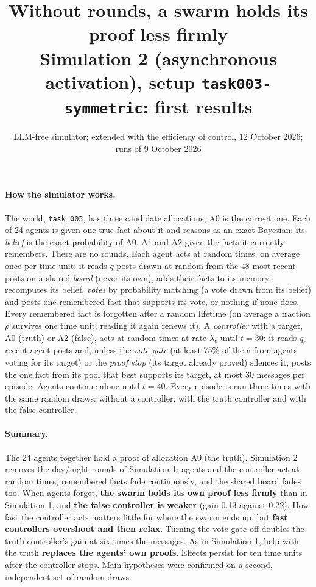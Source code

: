 \documentclass[10pt,a4paper]{article}
\title{\vspace{-1.2cm}\textbf{Without rounds, a swarm holds its proof less firmly}\\[2pt]
\large Simulation 2 (asynchronous activation), setup \texttt{task003-symmetric}: first results}
\author{LLM-free simulator; extended with the efficiency of control, 12 October 2026; runs of 9 October 2026}
\date{}
\begin{document}
\maketitle
\vspace{-1cm}

\paragraph{How the simulator works.} The world, \texttt{task\_003}, has three candidate
allocations; A0 is the correct one. Each of 24 agents is given one true fact about it and reasons as
an exact Bayesian: its \emph{belief} is the exact probability of A0, A1 and A2 given the facts it
currently remembers. There are no rounds. Each agent acts at random times, on average once per time
unit: it reads $q$ posts drawn at random from the 48 most recent posts on a shared \emph{board}
(never its own), adds their facts to its memory, recomputes its belief, \emph{votes} by probability
matching (a vote drawn from its belief) and posts one remembered fact that supports its vote, or
nothing if none does. Every remembered fact is forgotten after a random lifetime (on average a
fraction $\rho$ survives one time unit; reading it again renews it). A \emph{controller} with a
target, A0 (truth) or A2 (false), acts at random times at rate $\lambda_c$ until $t = 30$: it reads
$q_c$ recent agent posts and, unless the \emph{vote gate} (at least 75\% of them from agents voting
for its target) or the \emph{proof stop} (its target already proved) silences it, posts the one fact
from its pool that best supports its target, at most 30 messages per episode. Agents continue alone
until $t = 40$. Every episode is run three times with the same random draws: without a controller,
with the truth controller and with the false controller.

\paragraph{Summary.} The 24 agents together hold a proof of allocation A0 (the truth).
Simulation 2 removes the day/night rounds of Simulation 1: agents and the controller act at
random times, remembered facts fade continuously, and the shared board fades too. When
agents forget, \textbf{the swarm holds its own proof less firmly} than in Simulation 1, and
\textbf{the false controller is weaker} (gain 0.13 against 0.22). How fast the controller
acts matters little for where the swarm ends up, but \textbf{fast controllers overshoot and
then relax}. Turning the vote gate off doubles the truth controller's gain at six times
the messages. As in Simulation 1, help with the truth \textbf{replaces the agents' own
proofs}. Effects persist for ten time units after the controller stops. Main hypotheses
were confirmed on a second, independent set of random draws.
\end{document}
